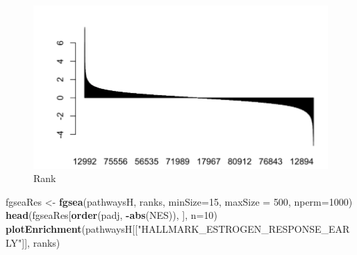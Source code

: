 \documentclass[
]{article}
\newenvironment{Shaded}{\begin{snugshade}}{\end{snugshade}}
\newcommand{\DataTypeTok}[1]{\textcolor[rgb]{0.13,0.29,0.53}{#1}}
\newcommand{\DecValTok}[1]{\textcolor[rgb]{0.00,0.00,0.81}{#1}}
\newcommand{\KeywordTok}[1]{\textcolor[rgb]{0.13,0.29,0.53}{\textbf{#1}}}
\newcommand{\NormalTok}[1]{#1}
\newcommand{\OperatorTok}[1]{\textcolor[rgb]{0.81,0.36,0.00}{\textbf{#1}}}
\newcommand{\StringTok}[1]{\textcolor[rgb]{0.31,0.60,0.02}{#1}}
\begin{document}
\begin{figure}
\centering
\includegraphics{rank.png}
\caption{Rank}
\end{figure}

\begin{Shaded}
\begin{Highlighting}[]
\NormalTok{fgseaRes <-}\StringTok{ }\KeywordTok{fgsea}\NormalTok{(pathwaysH, ranks, }\DataTypeTok{minSize=}\DecValTok{15}\NormalTok{, }\DataTypeTok{maxSize =} \DecValTok{500}\NormalTok{, }\DataTypeTok{nperm=}\DecValTok{1000}\NormalTok{)}
\KeywordTok{head}\NormalTok{(fgseaRes[}\KeywordTok{order}\NormalTok{(padj, }\OperatorTok{-}\KeywordTok{abs}\NormalTok{(NES)), ], }\DataTypeTok{n=}\DecValTok{10}\NormalTok{)}
\KeywordTok{plotEnrichment}\NormalTok{(pathwaysH[[}\StringTok{"HALLMARK_ESTROGEN_RESPONSE_EARLY"}\NormalTok{]], ranks)}
\end{Highlighting}
\end{Shaded}
\end{document}
